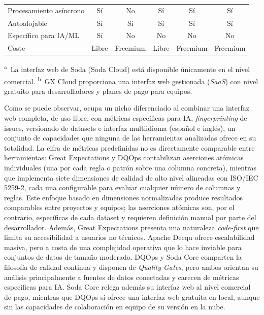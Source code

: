 \begin{table}[htbp]
\begin{tabularx}{\textwidth}{X c c c c c}
    Procesamiento asíncrono       & Sí      & No      & Sí      & Sí      & Sí \\
    Autoalojable                  & Sí      & Sí      & Sí      & Sí      & Sí \\
    Específico para IA/ML         & Sí      & No      & No      & No      & No \\
    Coste                         & Libre   & Freemium & Libre   & Freemium & Freemium \\
    \bottomrule
  \end{tabularx}
  \medskip\par\footnotesize\raggedright
  \textsuperscript{a}~La interfaz web de Soda (Soda Cloud) está disponible únicamente en el nivel comercial.
  \textsuperscript{b}~GX Cloud proporciona una interfaz web gestionada (\emph{SaaS}) con nivel gratuito para desarrolladores y planes de pago para equipos.
\end{table}

Como se puede observar, \dataqual ocupa un nicho diferenciado al combinar una
interfaz web completa, de uso libre, con métricas específicas para
\ac{IA}, \emph{fingerprinting} de issues, versionado de datasets e
interfaz multiidioma (español e inglés), un conjunto de capacidades que
ninguna de las herramientas analizadas ofrece en su totalidad.  La cifra de métricas predefinidas no es directamente comparable entre
herramientas: Great Expectations y DQOps contabilizan aserciones atómicas
individuales (una por cada regla o patrón sobre una columna concreta),
mientras que \dataqual implementa siete dimensiones de calidad de alto nivel
alineadas con \ac{ISO}/IEC 5259-2, cada una configurable para evaluar
cualquier número de columnas y reglas. Este enfoque basado en dimensiones
normalizadas produce resultados comparables entre proyectos y equipos;
las aserciones atómicas son, por el contrario, específicas de cada dataset
y requieren definición manual por parte del desarrollador. Además, Great
Expectations presenta una naturaleza \emph{code-first} que limita su
accesibilidad a usuarios no técnicos.  Apache Deequ ofrece escalabilidad masiva, pero a costa de una
complejidad operativa que lo hace inviable para conjuntos de datos de tamaño
moderado.  DQOps y Soda Core comparten la filosofía de calidad continua y disponen de
\emph{Quality Gates}, pero ambos orientan su análisis principalmente a fuentes
de datos conectadas y carecen de métricas específicas para \ac{IA}. Soda Core
relega además su interfaz web al nivel comercial de pago, mientras que DQOps
sí ofrece una interfaz web gratuita en local, aunque sin las capacidades de
colaboración en equipo de su versión en la nube.



